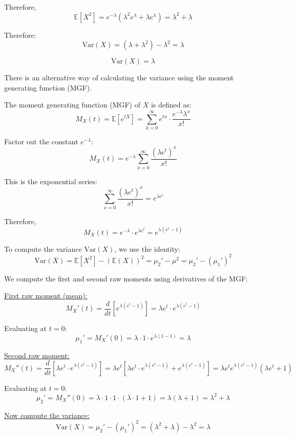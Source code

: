 \documentclass[twoside]{book}
\begin{document}
\begin{itemize}
Therefore,
\[
\mathbb{E}[X^2] = e^{-\lambda} \left( \lambda^2 e^{\lambda} + \lambda e^{\lambda} \right) = \lambda^2 + \lambda
\]

  Therefore:
    \[
    \text{Var}(X) = (\lambda + \lambda^2) - \lambda^2 = \lambda
    \]

    \begin{textbox}
        \[
    \text{Var}(X) = \lambda
    \]
    \end{textbox}

    \vspace{3mm}

    There is an alternative way of calculating the variance using the moment generating function (MGF).

    The moment generating function (MGF) of \( X \) is defined as:
    \[
M_X(t) = \mathbb{E}[e^{tX}] = \sum_{k=0}^{\infty} e^{t x} \cdot \frac{e^{-\lambda} \lambda^x}{x!}
\]

Factor out the constant \( e^{-\lambda} \):
\[
M_X(t) = e^{-\lambda} \sum_{x=0}^{\infty} \frac{(\lambda e^t)^x}{x!}
\]

This is the exponential series:
\[
\sum_{x=0}^{\infty} \frac{(\lambda e^t)^x}{x!} = e^{\lambda e^t}
\]

Therefore,
\[
M_X(t) = e^{-\lambda} \cdot e^{\lambda e^t} = e^{\lambda(e^t - 1)}
\]

To compute the variance \( \mathrm{Var}(X) \), we use the identity:
\[
\mathrm{Var}(X) = \mathbb{E}[X^2] - (\mathbb{E}(X))^2 = \mu_2' - \mu^2 = \mu_2' - (\mu_1')^2
\]

We compute the first and second raw moments using derivatives of the MGF:

\underline{First raw moment (mean):}
\[
M_X'(t) = \frac{d}{dt} \left[ e^{\lambda(e^t - 1)} \right]
= \lambda e^t \cdot e^{\lambda(e^t - 1)}
\]

Evaluating at \( t = 0 \):
\[
\mu_1' = M_X'(0) = \lambda \cdot 1 \cdot e^{\lambda(1 - 1)} = \lambda
\]

\underline{Second raw moment:}
\[
M_X''(t) = \frac{d}{dt} \left[ \lambda e^t \cdot e^{\lambda(e^t - 1)} \right]
= \lambda e^t \left[ \lambda e^t \cdot e^{\lambda(e^t - 1)} + e^{\lambda(e^t - 1)} \right]
= \lambda e^t e^{\lambda(e^t - 1)} (\lambda e^t + 1)
\]

Evaluating at \( t = 0 \):
\[
\mu_2' = M_X''(0) = \lambda \cdot 1 \cdot 1 \cdot (\lambda \cdot 1 + 1) = \lambda(\lambda + 1) = \lambda^2 + \lambda
\]

\underline{Now compute the variance:}
\[
\mathrm{Var}(X) = \mu_2' - (\mu_1')^2 = (\lambda^2 + \lambda) - \lambda^2 = \lambda
\]
\end{itemize}
\end{document}
